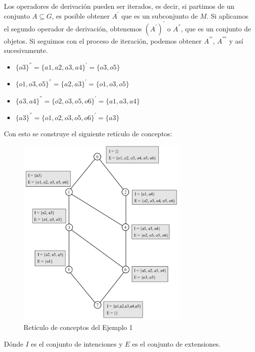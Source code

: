 \documentclass[../../main.tex]{subfiles}
\begin{document}
Los operadores de derivación pueden ser iterados, es decir, si partimos de un conjunto $A \subseteq G$, es posible obtener $A^{'}$ que es un subconjunto de $M$. Si aplicamos el segundo operador de derivación, obtenemos $(A^{'})^{'}$ o $A^{''}$, que es un conjunto de objetos. Si seguimos con el proceso de iteración, podemos obtener $A^{'''}$, $A^{''''}$ y así sucesivamente.

\begin{itemize}
    \item $\{ o3 \}^{''} = \{ a1,a2,a3,a4 \}^{'} = \{ o3, o5 \}$ 
    \item $\{ o1,o3,o5 \}^{''} = \{ a2,a3 \}^{'} = \{ o1,o3,o5 \}$  
    \item $\{ a3,a4 \}^{''} = \{ o2,o3,o5,o6 \}^{'} = \{ a1,a3,a4 \}$ 
    \item $\{ a3 \}^{''} = \{ o1,o2,o3,o5,o6 \}^{'} = \{ a3 \}$ 
\end{itemize}

Con esto se construye el siguiente retículo de conceptos:
\begin{figure}[h]
\centering
\includegraphics[width=0.75\textwidth]{images/3_fca/reticulo1.png}
\caption{Retículo de conceptos del Ejemplo 1}
\end{figure}

Dónde $I$ es el conjunto de intenciones y $E$ es el conjunto de extensiones.
\end{document}
